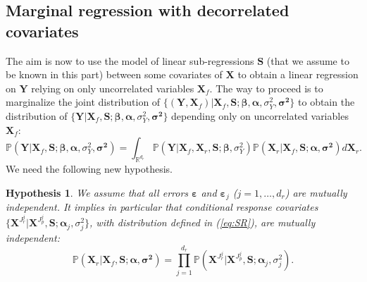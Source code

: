 \documentclass[11pt,a4paper]{article}
\newtheorem{hyp}{Hypothesis}
\begin{document}
\subsection{Marginal regression with decorrelated covariates}
The aim is now to use the model of linear sub-regressions $\boldsymbol{S}$ (that we assume to be known in this part) between some covariates of $\boldsymbol{X}$ to obtain a linear regression on $\boldsymbol{Y}$ relying on only uncorrelated variables $\boldsymbol{X}_f$.  The way to proceed is to marginalize the joint distribution of $\{(\boldsymbol{Y},\boldsymbol{X}_f) |\boldsymbol{X}_f,\boldsymbol{S};\boldsymbol{\beta},\boldsymbol{\alpha},\sigma_Y^2,\boldsymbol{\sigma^2}\}$ to obtain the distribution of $\{\boldsymbol{Y} |\boldsymbol{X}_f,\boldsymbol{S};\boldsymbol{\beta},\boldsymbol{\alpha},\sigma_Y^2,\boldsymbol{\sigma^2}\}$ depending only on uncorrelated variables $\boldsymbol{X}_f$:
\begin{equation}\label{eq:marginal}
\mathbb{P}(\boldsymbol{Y} |\boldsymbol{X}_f,\boldsymbol{S};\boldsymbol{\beta},\boldsymbol{\alpha},\sigma_Y^2,\boldsymbol{\sigma^2}) = \int_{{\mathbb{R}^{d_r}}}\mathbb{P}(\boldsymbol{Y}| \boldsymbol{X}_f,\boldsymbol{X}_r,\boldsymbol{S};\boldsymbol{\beta},\sigma_Y^2) \mathbb{P}(\boldsymbol{X}_r | \boldsymbol{X}_f,\boldsymbol{S};\boldsymbol{\alpha},\boldsymbol{\sigma^2}) d\boldsymbol{X}_r.
\end{equation}
We need the following new hypothesis.

\begin{hyp}\label{H3}
We assume that all errors $\boldsymbol{\varepsilon}$ and $\boldsymbol{\varepsilon}_j$ ($j=1,\ldots,d_r$) are {\it mutually independent}. It implies in particular that conditional response covariates $\{\boldsymbol{X}^{J_{r}^j}|\boldsymbol{X}^{J_{p}^j},\boldsymbol{S};\boldsymbol{\alpha}_j,\sigma^2_j\}$, with distribution defined in (\ref{eq:SR}), are {\it mutually independent}:
\begin{equation}\label{eq:H3}
\mathbb{P}(\boldsymbol{X}_r | \boldsymbol{X}_f,\boldsymbol{S};\boldsymbol{\alpha},\boldsymbol{\sigma^2}) = \prod_{j=1}^{d_r} \mathbb{P}(\boldsymbol{X}^{J_{r}^j}|\boldsymbol{X}^{J_{p}^j},\boldsymbol{S};\boldsymbol{\alpha}_j,\sigma^2_j).
\end{equation}
\end{hyp}

\vspace{3mm}
\end{document}
